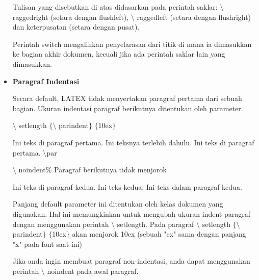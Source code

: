 \begin{itemize}
Tulisan yang disebutkan di atas didasarkan pada perintah saklar: $\setminus$ raggedright (setara dengan flushleft), $\setminus$ raggedleft (setara dengan flushright) dan keterpusatan (setara dengan pusat). \par

Perintah switch mengalihkan penyelarasan dari titik di mana ia dimasukkan ke bagian akhir dokumen, kecuali jika ada perintah saklar lain yang dimasukkan.\par

\vspace{10pt}
	\item {\fontsize{14pt}{14pt}\selectfont \textbf{Paragraf Indentasi}}\par

Secara default, LATEX tidak menyertakan paragraf pertama dari sebuah bagian. Ukuran indentasi paragraf berikutnya ditentukan oleh parameter. \par

\hspace*{0.5in}$\setminus$ setlength $ \{ $$\setminus$ parindent$ \} $ $ \{ $10ex$ \} $\par

\hspace*{0.5in}Ini teks di paragraf pertama. Ini teksnya terlebih dahulu. Ini teks di paragraf pertama. $\setminus$par\par

\hspace*{0.5in}$\setminus$ noindent$\%$ Paragraf berikutnya tidak menjorok\par

\hspace*{0.5in}Ini teks di paragraf kedua. Ini teks kedua. Ini teks dalam paragraf kedua.\par

\hspace*{0.5in}
\vspace{12pt}\hspace*{0.5in}Panjang default parameter ini ditentukan oleh kelas dokumen yang digunakan. Hal ini memungkinkan untuk mengubah ukuran indent paragraf dengan menggunakan perintah $\setminus$ setlength. Pada paragraf $\setminus$ setlength $ \{ $$\setminus$ parindent$ \} $ $ \{ $10ex$ \} $ akan menjorok 10ex (sebuah "ex" sama dengan panjang "x" pada font saat ini)\par

Jika anda ingin membuat paragraf non-indentasi, anda dapat menggunakan perintah $\setminus$ noindent pada awal paragraf.\par


\end{itemize}
